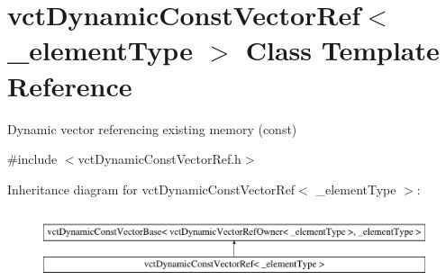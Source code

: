 \hypertarget{classvct_dynamic_const_vector_ref}{\section{vct\-Dynamic\-Const\-Vector\-Ref$<$ \-\_\-element\-Type $>$ Class Template Reference}
\label{classvct_dynamic_const_vector_ref}
}


Dynamic vector referencing existing memory (const)  




{\ttfamily \#include $<$vct\-Dynamic\-Const\-Vector\-Ref.\-h$>$}

Inheritance diagram for vct\-Dynamic\-Const\-Vector\-Ref$<$ \-\_\-element\-Type $>$\-:\begin{figure}[H]
\begin{center}
\leavevmode
\includegraphics[height=2.000000cm]{d4/dab/classvct_dynamic_const_vector_ref}
\end{center}
\end{figure}
